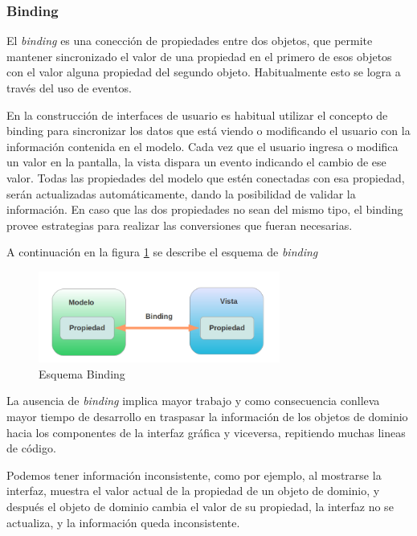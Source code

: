 

\subsubsection{Binding}
\label{binding}

	El \emph{binding} es una conección de propiedades entre dos objetos, que
	permite mantener sincronizado el valor de una propiedad en el primero de esos
	objetos con el valor alguna propiedad del segundo objeto.
	Habitualmente esto se logra a través del uso de eventos.
	
	En la construcción de interfaces de usuario es habitual utilizar el concepto de
	binding para sincronizar los datos que está viendo o modificando el usuario
	con la información contenida en el modelo.
	Cada vez que el usuario ingresa o modifica un valor en la pantalla, la
	vista dispara un evento indicando el cambio de ese valor. Todas las
	propiedades del modelo que estén conectadas con esa propiedad, serán
	actualizadas automáticamente, dando la posibilidad de validar la información.
	En caso que las dos propiedades no sean del mismo tipo, el binding provee
	estrategias para realizar las conversiones que fueran necesarias.
	
	A continuación en la figura \ref{fig:binding} se describe el esquema de
		\emph{binding}
		
		\begin{figure}[h]
			\centering
			\includegraphics[width=300px]{img/binding}
			\caption{Esquema Binding}
			\label{fig:binding}
		\end{figure}
		
		\bigskip
	
	La ausencia de \emph{binding} implica mayor trabajo  y como consecuencia
	conlleva mayor tiempo de desarrollo en  traspasar la información de los
	objetos de dominio hacia los componentes de la interfaz gráfica y viceversa, repitiendo muchas lineas de código.
	
	Podemos tener información inconsistente, como por ejemplo, al mostrarse la interfaz,
	muestra el valor actual de la propiedad de un objeto de dominio, y después el
	objeto de dominio cambia el valor de su propiedad, la interfaz no se actualiza,
	y la información queda inconsistente.
	
